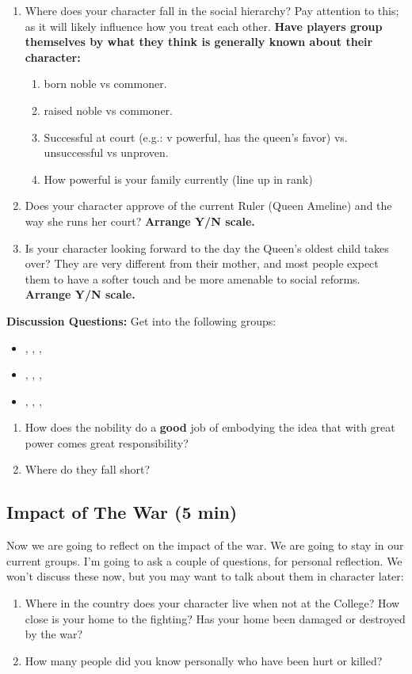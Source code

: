 \documentclass[green]{GL2020}
\begin{document}
\begin{enumerate}
	\item Where does your character fall in the social hierarchy? Pay attention to this; as it will likely influence how you treat each other. \textbf{Have players group themselves by what they think is generally known about their character:}
	\begin{enumerate}
		\item born noble vs commoner.
		\item raised noble vs commoner.
		\item Successful at court (e.g.: v powerful, has the queen’s favor) vs. unsuccessful vs unproven.
		\item How powerful is your family currently (line up in rank)
	\end{enumerate}
	\item Does your character approve of the current Ruler (Queen Ameline) and the way she runs her court? \textbf{Arrange Y/N scale.}
	\item Is your character looking forward to the day the Queen’s oldest child takes over? They are very different from their mother, and most people expect them to have a softer touch and be more amenable to social reforms. \textbf{Arrange Y/N scale.}
\end{enumerate}

\textbf{Discussion Questions:}
Get into the following groups:
\begin{itemize}
	\item \cChupStudent{}, \cCurse{}, \cDisney{}, \cInterpol{}
	\item \cAdopted{}, \cMusic{}, \cHedonist{}, \cWildCard{}
	\item \cPrince{}, \cEvil{}, \cHistory{}, \cLibAssist{}
\end{itemize}

\begin{enumerate}
	\item How does the nobility do a \textbf{good} job of embodying the idea that with great power comes great responsibility?
	\item Where do they fall short?
\end{enumerate}

\subsection*{Impact of The War (5 min)}
Now we are going to reflect on the impact of the war. We are going to stay in our current groups. I’m going to ask a couple of questions, for personal reflection. We won't discuss these now, but you may want to talk about them in character later:
\begin{enumerate}
	\item Where in the country does your character live when not at the College? How close is your home to the fighting? Has your home been damaged or destroyed by the war?
	\item How many people did you know personally who have been hurt or killed?
\end{enumerate}
\end{document}
